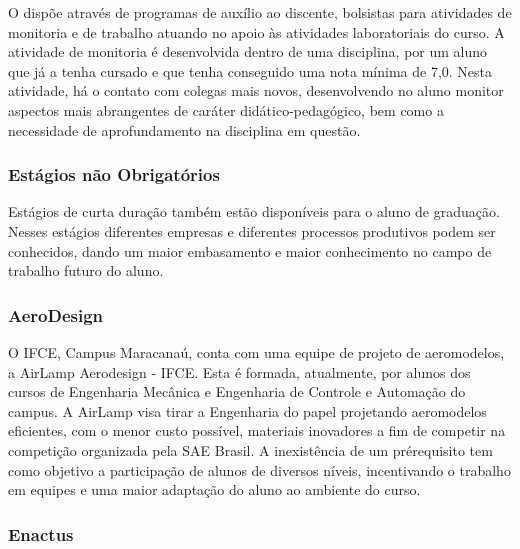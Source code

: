 \documentclass{paper}
\begin{document}
O \NOMECURSO dispõe através de programas de auxílio ao discente, bolsistas para atividades de monitoria e de trabalho atuando no apoio às atividades laboratoriais do curso. A atividade de monitoria é desenvolvida dentro de uma disciplina, por um aluno que já a tenha cursado e que tenha conseguido uma nota mínima de 7,0. Nesta atividade, há o contato com colegas mais novos, desenvolvendo no aluno monitor aspectos mais abrangentes de caráter didático-pedagógico, bem como a necessidade de aprofundamento na disciplina em questão.

\subsubsection{Estágios não Obrigatórios}
Estágios de curta duração também estão disponíveis para o aluno de graduação.
Nesses estágios diferentes empresas e diferentes processos produtivos podem ser
conhecidos, dando um maior embasamento e maior conhecimento no campo de
trabalho futuro do aluno.



\subsubsection{AeroDesign}

O IFCE, Campus Maracanaú, conta com uma equipe de projeto de aeromodelos, a AirLamp Aerodesign - IFCE. Esta é formada, atualmente, por alunos dos cursos de Engenharia Mecânica e Engenharia de Controle e Automação do campus. A AirLamp visa tirar a Engenharia do papel projetando aeromodelos eficientes, com o menor custo possível, materiais inovadores a fim de competir na competição organizada pela SAE Brasil. A inexistência de um prérequisito tem como objetivo a participação de alunos de diversos níveis, incentivando o trabalho em equipes e uma maior adaptação do aluno ao ambiente do curso.

\subsubsection{Enactus}
\end{document}

